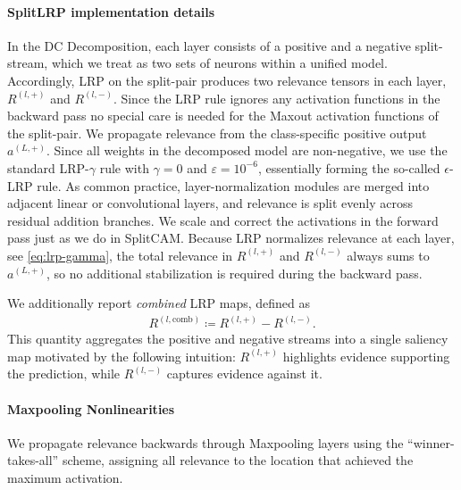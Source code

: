 \paragraph{SplitLRP implementation details}
In the DC Decomposition, each layer consists of a positive and a negative split-stream, which we treat as two sets of neurons within a unified model. Accordingly, LRP on the split-pair produces two relevance tensors in each layer, $R^{(l,+)}$ and $R^{(l,-)}$.
Since the LRP rule ignores any activation functions in the backward pass no special care is needed for the Maxout activation functions of the split-pair.
We propagate relevance from the class-specific positive output $a^{(L,+)}$. Since all weights in the decomposed model are non-negative, we use the standard LRP-$\gamma$ rule with $\gamma=0$ and $\varepsilon = 10^{-6}$, essentially forming the so-called $\epsilon$-LRP rule. As common practice, layer-normalization modules are merged into adjacent linear or convolutional layers, and relevance is split evenly across residual addition branches.
We scale and correct the activations in the forward pass just as we do in SplitCAM.
Because LRP normalizes relevance at each layer, see \cref{eq:lrp-gamma}, the total relevance in $R^{(l,+)}$ and $R^{(l,-)}$ always sums to $a^{(L,+)}$, so no additional stabilization is required during the backward pass.

We additionally report \emph{combined} LRP maps, defined as
\begin{align}
    R^{(l,\text{comb})} \coloneqq R^{(l,+)} - R^{(l,-)}.
\end{align}
This quantity aggregates the positive and negative streams into a single saliency map motivated by the following intuition: 
$R^{(l,+)}$ highlights evidence supporting the prediction, while $R^{(l,-)}$ captures evidence against it.

\paragraph{Maxpooling Nonlinearities}
We propagate relevance backwards through Maxpooling layers using the ``winner-takes-all'' scheme, assigning all relevance to the location that achieved the maximum activation.